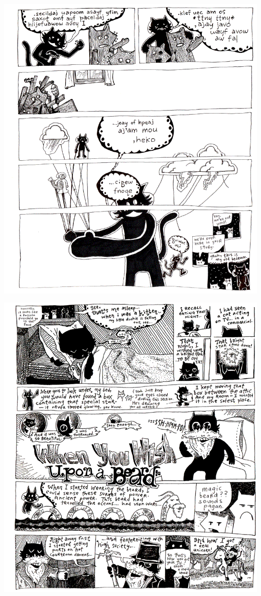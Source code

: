 \documentclass[10pt,twoside]{report}
\begin{document}
\vspace*{0.6cm} \includegraphics[width=1.0\textwidth]{cache/88.png}
\newpage

\vspace*{0.6cm} \includegraphics[width=1.0\textwidth]{cache/89.png}
\newpage
\end{document}
